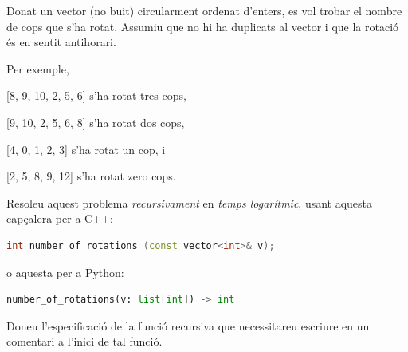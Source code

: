 

\Statement

Donat un vector (no buit) circularment ordenat d'enters,
es vol trobar el nombre de cops que s'ha rotat.
Assumiu que no hi ha duplicats al vector
i que la rotació és en sentit antihorari.

\medskip

Per exemple,
\begin{itemize*}
\item {} [8, 9, 10, 2, 5, 6] s'ha rotat tres cops,
\item {} [9, 10, 2, 5, 6, 8] s'ha rotat dos cops,
\item {} [4, 0, 1, 2, 3] s'ha rotat un cop, i
\item {} [2, 5, 8, 9, 12] s'ha rotat zero cops.
\end{itemize*}

\medskip

Resoleu aquest problema \emph{recursivament} en \emph{temps logarítmic},
usant aquesta capçalera per a C++:

\begin{lstlisting}[language=C++,morekeywords={string,vector}]
    int number_of_rotations (const vector<int>& v);
\end{lstlisting}

o aquesta per a Python:

\begin{lstlisting}[language=Python]
    number_of_rotations(v: list[int]) -> int
\end{lstlisting}

\medskip

Doneu l'especificació de la funció recursiva que necessitareu escriure en un
comentari a l'inici de tal funció.

\ObservationNoMain
